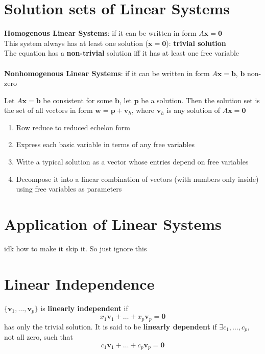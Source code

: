 \documentclass{report}
\begin{document}
\section{Solution sets of Linear Systems}

\textbf{Homogenous Linear Systems}: if it can be written in form $A \mathbf{x} = \mathbf{0}$
\\This system always has at least one solution ($\mathbf{x} = \mathbf{0}$): \textbf{trivial solution}
\\The equation has a \textbf{non-trivial} solution iff it has at least one free variable
\\\\\textbf{Nonhomogenous Linear Systems}: if it can be written in form $A \mathbf{x} = \mathbf{b}$,
$\mathbf{b}$ non-zero

\begin{theorem}
\end{theorem}
Let $A \mathbf{x} = \mathbf{b}$ be consistent for some $\mathbf{b}$, let $\mathbf{p}$ be a solution.
Then the solution set is the set of all vectors in form $\mathbf{w} = \mathbf{p} + \mathbf{v}_h$,
where $\mathbf{v}_h$ is any solution of $A \mathbf{x} = \mathbf{0}$

\begin{tcolorbox}[colback=blue!5!white, colframe=blue!75!black, title=Writing a solution set in parametric vector form]
\begin{enumerate}
    \item Row reduce to reduced echelon form
    \item Express each basic variable in terms of any free variables
    \item Write a typical solution as a vector whose entries depend on free variables
    \item Decompose it into a linear combination of vectors (with numbers only inside) using free variables as parameters
\end{enumerate}
\end{tcolorbox}

\section{Application of Linear Systems} idk how to make it skip it. So just ignore this
\section{Linear Independence}
\begin{definition}
\end{definition}
$\{ \mathbf{v}_1, \ldots, \mathbf{v}_p\}$ is \textbf{linearly independent} if
\[
x_1 \mathbf{v}_1 + \ldots + x_p \mathbf{v}_p = \mathbf{0}
\]
has only the trivial solution. It is said to be \textbf{linearly dependent} if $\exists c_1, \ldots, c_p$, not all zero, such that
\[
c_1 \mathbf{v}_1 + \ldots + c_p \mathbf{v}_p = \mathbf{0}
\]
\end{document}

